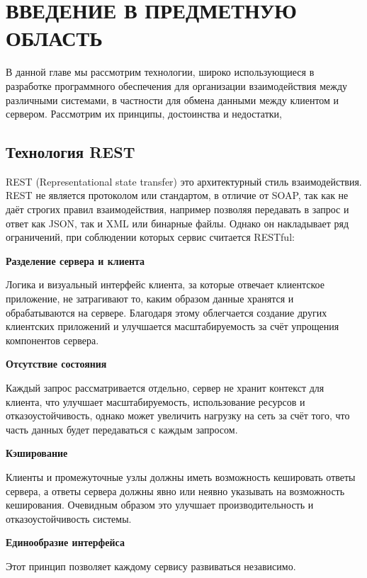 \chapter{ВВЕДЕНИЕ В ПРЕДМЕТНУЮ ОБЛАСТЬ} \label{ch:ch1}

В данной главе мы рассмотрим технологии, широко использующиеся в разработке программного обеспечения для организации взаимодействия между различными системами, в частности для обмена данными между клиентом и сервером.
Рассмотрим их принципы, достоинства и недостатки,

\section{Технология REST}\label{sec:rest}

REST (Representational state transfer) это архитектурный стиль взаимодействия.
REST не является протоколом или стандартом, в отличие от SOAP, так как не даёт строгих правил взаимодействия, например позволяя передавать в запрос и ответ как JSON, так и XML или бинарные файлы.
Однако он накладывает ряд ограничений\cite{fielding-dissertation}, при соблюдении которых сервис считается RESTful:

\textbf{Разделение сервера и клиента}

Логика и визуальный интерфейс клиента, за которые отвечает клиентское приложение, не затрагивают то, каким образом данные хранятся и обрабатываются на сервере.
Благодаря этому облегчается создание других клиентских приложений и улучшается масштабируемость за счёт упрощения компонентов сервера.

\textbf{Отсутствие состояния}

Каждый запрос рассматривается отдельно, сервер не хранит контекст для клиента, что улучшает масштабируемость, использование ресурсов и отказоустойчивость, однако может увеличить нагрузку на сеть за счёт того, что часть данных будет передаваться с каждым запросом.

\textbf{Кэширование}

Клиенты и промежуточные узлы должны иметь возможность кешировать ответы сервера, а ответы сервера должны явно или неявно указывать на возможность кеширования.
Очевидным образом это улучшает производительность и отказоустойчивость системы.

\textbf{Единообразие интерфейса}

Этот принцип позволяет каждому сервису развиваться независимо.

